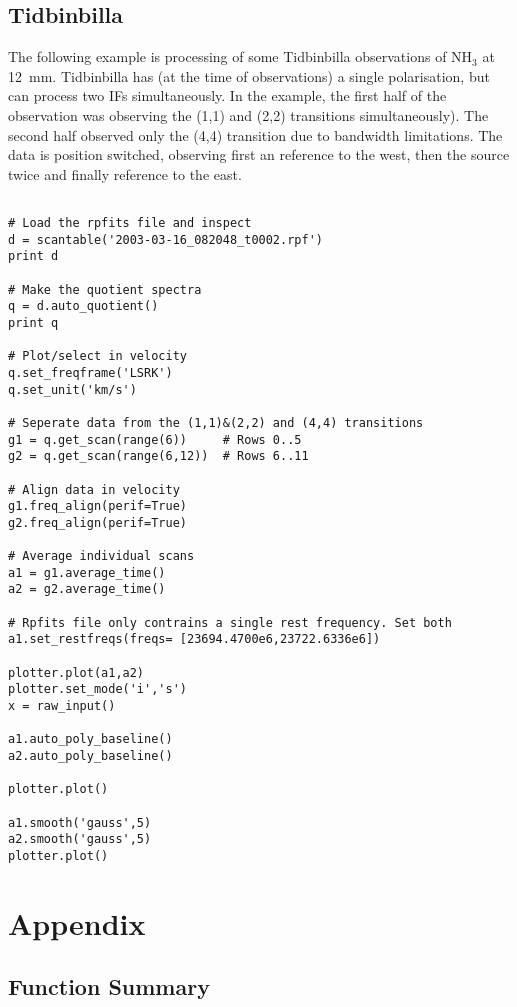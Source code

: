 \documentclass[11pt]{article}
\begin{document}
\subsection{Tidbinbilla}

The following example is processing of some Tidbinbilla observations
of NH$_3$ at 12~mm. Tidbinbilla has (at the time of observations) a
single polarisation, but can process two IFs simultaneously. In the
example, the first half of the observation was observing the (1,1) and
(2,2) transitions simultaneously). The second half observed only the
(4,4) transition due to bandwidth limitations. The data is position
switched, observing first an reference to the west, then the source
twice and finally reference to the east.

\begin{verbatim}

# Load the rpfits file and inspect
d = scantable('2003-03-16_082048_t0002.rpf')
print d

# Make the quotient spectra
q = d.auto_quotient()
print q

# Plot/select in velocity
q.set_freqframe('LSRK')
q.set_unit('km/s')

# Seperate data from the (1,1)&(2,2) and (4,4) transitions
g1 = q.get_scan(range(6))     # Rows 0..5
g2 = q.get_scan(range(6,12))  # Rows 6..11

# Align data in velocity 
g1.freq_align(perif=True)
g2.freq_align(perif=True)

# Average individual scans
a1 = g1.average_time()
a2 = g2.average_time()

# Rpfits file only contrains a single rest frequency. Set both
a1.set_restfreqs(freqs= [23694.4700e6,23722.6336e6])

plotter.plot(a1,a2)
plotter.set_mode('i','s')
x = raw_input()

a1.auto_poly_baseline()
a2.auto_poly_baseline()

plotter.plot()

a1.smooth('gauss',5)
a2.smooth('gauss',5)
plotter.plot()

\end{verbatim}

\newpage

\section{Appendix}

\subsection{Function Summary}
\end{document}
